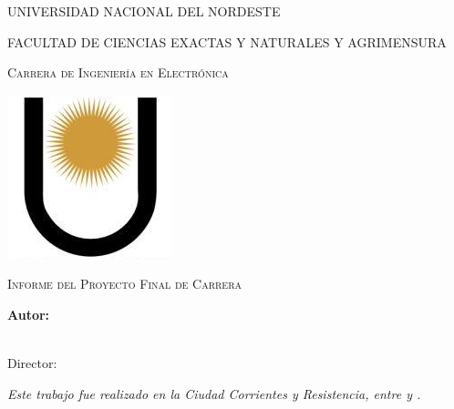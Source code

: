\documentclass[
11pt, %
spanish,
singlespacing, %
parskip, %
headsepline, %
]{MastersDoctoralThesis} %
\author{González, Fernando Augusto} %
\begin{document}
\frontmatter %

\pagestyle{plain} %


\begin{titlepage}
\begin{center}

{\scshape\LARGE UNIVERSIDAD NACIONAL DEL NORDESTE\par}\vspace{0.1cm} %
{\scshape\LARGE FACULTAD DE CIENCIAS EXACTAS Y NATURALES Y AGRIMENSURA\par}\vspace{0.1cm} %
{\scshape\LARGE Carrera de Ingeniería en Electrónica\par}\vspace{1cm} %

\includegraphics[width=.3\textwidth]{./Figures/logo_unne.png}
\vspace{1cm}

\textsc{\Large Informe del Proyecto Final de Carrera}\\[0.5cm] %

{\huge \bfseries \ttitle\par}\vspace{0.4cm} %

\vspace{1cm}
\LARGE\textbf{Autor:\\
\authorname}\\ %

\vspace{1cm}

\large
\vspace{10pt}
{Director:} \\
{\supname} %
 
 
\vfill
\textit{Este trabajo fue realizado en la Ciudad Corrientes y Resistencia, entre \fechaINICIOname \hspace{1pt} y \fechaFINALname.}
\end{center}
\end{titlepage}
\end{document}
